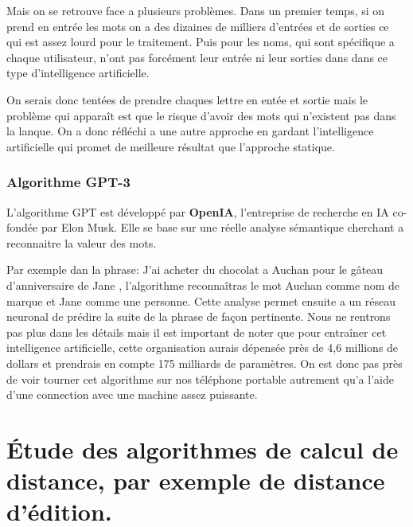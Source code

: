 \documentclass[final, 10pt]{report}
\begin{document}
        Mais on se retrouve face a plusieurs problèmes. 
        Dans un premier temps, si on prend en entrée les mots on a des dizaines de milliers d'entrées et de sorties ce qui est assez lourd pour le traitement.
        Puis pour les noms, qui sont spécifique a chaque utilisateur, n'ont pas forcément leur entrée ni leur sorties dans dans ce type d'intelligence artificielle.
        
        On serais donc tentées de prendre chaques lettre en entée et sortie mais le problème qui apparaît est que le risque d'avoir des mots qui n'existent pas dans la lanque.
        On a donc réfléchi a une autre approche en gardant l'intelligence artificielle qui promet de meilleure résultat que l'approche statique.
    
    \subsection{Algorithme GPT-3}


        L'algorithme GPT est développé par \textbf{OpenIA}, l’entreprise de recherche en IA co-fondée par Elon Musk\cite{noauthor_quest_2021}.
        Elle se base sur une réelle analyse sémantique cherchant a reconnaitre la valeur des mots.
        
        Par exemple dan la phrase: \og J'ai acheter du chocolat a Auchan pour le gâteau d'anniversaire de Jane \fg{}, l'algorithme reconnaîtras le mot \og Auchan \fg{} comme nom de marque et \og Jane \fg{} comme une personne.
        Cette analyse permet ensuite a un réseau neuronal de prédire la suite de la phrase de façon pertinente.
        Nous ne rentrons pas plus dans les détails mais il est important de noter que pour entraîner cet intelligence artificielle, cette organisation aurais dépensée près de 4,6 millions de dollars\cite{noauthor_quest_2021} et prendrais en compte 175 milliards de paramètres\cite{noauthor_quest_2021}.
        On est donc pas près de voir tourner cet algorithme sur nos téléphone portable autrement qu'a l'aide d'une connection avec une machine assez puissante.

\chapter{Étude des algorithmes de calcul de distance, par exemple de distance d’édition.}
\end{document}
